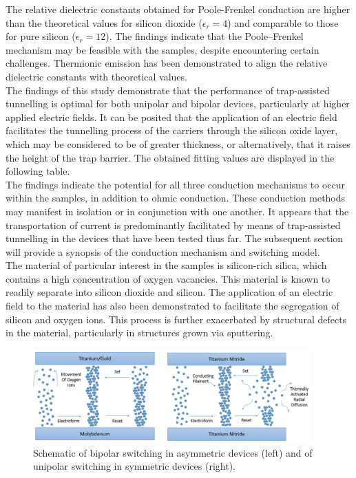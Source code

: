 \noindent  The relative dielectric constants obtained for Poole-Frenkel conduction are higher than the theoretical values for silicon dioxide ($\epsilon_r = 4$) and comparable to those for pure silicon ($\epsilon_r = 12$). The findings indicate that the Poole–Frenkel mechanism may be feasible with the samples, despite encountering certain challenges. Thermionic emission has been demonstrated to align the relative dielectric constants with theoretical values. \\

\noindent The findings of this study demonstrate that the performance of trap-assisted tunnelling is optimal for both unipolar and bipolar devices, particularly at higher applied electric fields. It can be posited that the application of an electric field facilitates the tunnelling process of the carriers through the silicon oxide layer, which may be considered to be of greater thickness, or alternatively, that it raises the height of the trap barrier. The obtained fitting values are displayed in the following table. \\

\noindent The findings indicate the potential for all three conduction mechanisms to occur within the samples, in addition to ohmic conduction. These conduction methods may manifest in isolation or in conjunction with one another. It appears that the transportation of current is predominantly facilitated by means of trap-assisted tunnelling in the devices that have been tested thus far. The subsequent section will provide a synopsis of the conduction mechanism and switching model.\\ 

\noindent The material of particular interest in the samples is silicon-rich silica, which contains a high concentration of oxygen vacancies. This material is known to readily separate into silicon dioxide and silicon. The application of an electric field to the material has also been demonstrated to facilitate the segregation of silicon and oxygen ions. This process is further exacerbated by structural defects in the material, particularly in structures grown via sputtering.\\

\begin{figure}[htbp!] 
    \centering    
    \includegraphics[width=0.95\textwidth]{Chapter3/Figs/v.png}
    \caption[Schematic of switching mechanism in SiOx devices.]{Schematic of bipolar switching in asymmetric devices (left) and of unipolar switching in symmetric devices (right).}
    \label{fig:3v}
\end{figure}

